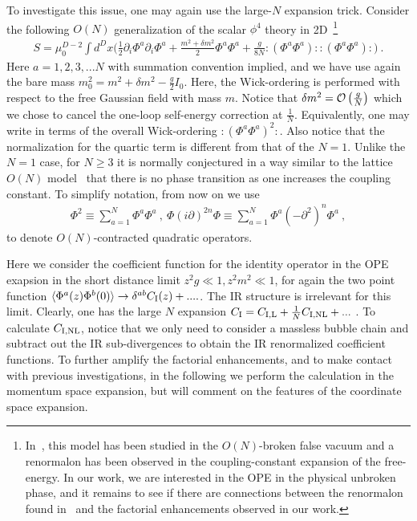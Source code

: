 \documentclass[a4paper,11pt]{article}
\begin{document}
To investigate this issue, one may again use the large-$N$ expansion trick. Consider the following $O(N)$ generalization of the scalar $\phi^4$ theory in 2D~\footnote{In~\cite{Marino:2019fvu}, this model has been studied in the $O(N)$-broken false vacuum and a renormalon has been observed in the coupling-constant expansion of the free-energy. In our work, we are interested in the OPE in the physical unbroken phase, and it remains to see if there are connections between the renormalon found in~\cite{Marino:2019fvu} and the factorial enhancements observed in our work.}
\begin{align}
S=\mu_0^{D-2}\int d^Dx \bigg(\frac{1}{2}\partial_{i}\Phi^a\partial_{i}\Phi^a+\frac{m^2+\delta m^2}{2}\Phi^a\Phi^a+\frac{g}{8N}:(\Phi^a\Phi^a): :(\Phi^a\Phi^a): \bigg)\ .
\end{align}
Here $a=1,2,3,...N$ with summation convention implied, and we have use again the bare mass $m_0^2=m^2+\delta m^2-\frac{g}{2}I_0$. Here, the Wick-ordering is performed with respect to the free Gaussian field with mass $m$. Notice that $\delta m^2={\cal O}\left(\frac{g}{N}\right)$ which we chose to cancel the one-loop self-energy correction at $\frac{1}{N}$. Equivalently, one may write in terms of the overall Wick-ordering $:(\Phi^a\Phi^a)^2:$. Also notice that the normalization for the quartic term is different from that of the $N=1$. Unlike the $N=1$ case, for $N\ge 3$ it is normally conjectured in a way similar to the lattice $O(N)$ model~\cite{Polyakov:1975rr} that there is no phase transition as one increases the coupling constant. 
To simplify notation, from now on we use 
\begin{align}
\Phi^2\equiv \sum_{a=1}^N\Phi^a\Phi^a \ , \ \Phi(i\partial)^{2n}\Phi \equiv\sum_{a=1}^N \Phi^a(-\partial^2)^n\Phi^a \ , 
\end{align}
 to denote $O(N)$-contracted quadratic operators.

Here we consider the coefficient function for the identity operator in the OPE exapsion in the short distance limit  $z^2g\ll1, z^2m^2\ll1$, for again the two point function $\langle\Phi^a(z)\Phi^b(0)\rangle \rightarrow \delta^{ab} C_{\rm I}(z) + ....$.  The IR structure is irrelevant for this limit. 
Clearly, one has the large $N$ expansion $C_{\rm I}=C_{\rm I,L}+\frac{1}{N}C_{\rm I,NL}+...$ . To calculate $C_{\rm I,{\rm NL}}$, notice that we only need to consider a massless bubble chain and subtract out the IR sub-divergences to obtain the IR renormalized coefficient functions. To further amplify the factorial enhancements, and to make contact with previous investigations, in the following we perform the calculation in the momentum space expansion, but will comment on the features of the coordinate space expansion. 
\end{document}
